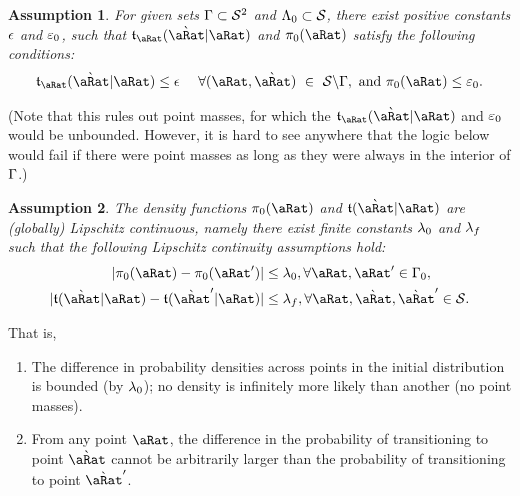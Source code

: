 \documentclass[\econtexRoot/BufferStockTheory.tex]{subfiles}
\begin{document}
\theoremstyle{plain}
\newtheorem{assumption}{Assumption}
\begin{assumption}\label{assn:Bounded} For given sets $\Gamma \subset \mathcal{S}^{2}$ and $\Lambda_{0} \subset \mathcal{S}$, there exist positive constants $\epsilon$ and $\varepsilon_{0}$, such that $\DnsPntNxtFmPntNow_{\pnt}(\Nxt{\pnt}|\pnt) $ and $\DnsPnt_{0}(\pnt)$ satisfy the following conditions:
  \begin{equation}\begin{gathered}\begin{aligned}
    \DnsPntNxtFmPntNow_{\pnt}(\Nxt{\pnt}|\pnt) \leq \DnsSetNxtFmPntNowBnd ~~~~\forall(\pnt,\Nxt{\pnt})~\in~\SetFullCnts \backslash \KrnPntNxtFmPntNowSetSprtTrnc, \text{~and~} \DnsPnt_{0}(\pnt) \leq \DnsPntBnd_{0}.
  \end{aligned}\end{gathered}\end{equation}
\end{assumption}

(Note that this rules out point masses, for which the $\DnsPntNxtFmPntNow_{\pnt}(\Nxt{\pnt}|\pnt)$ and $\varepsilon_{0}$ would be unbounded.  However, it is hard to see anywhere that the logic below would fail if there were point masses as long as they were always in the interior of $\Gamma$.)

\begin{assumption}\label{assn:Lipschitz} The density functions $\DnsPnt_{0}(\pnt)$ and $\DnsPntNxtFmPntNow(\Nxt{\pnt}|\pnt)$ are (globally) Lipschitz continuous, namely there exist finite constants $\lambda_{0}$ and $\lambda_{f}$ such that the following Lipschitz continuity assumptions hold:
  \begin{equation}\begin{gathered}\begin{aligned}
    |\DnsPnt_{0}(\pnt)-\DnsPnt_{0}(\pnt^{\prime})| & \leq \LipschitzDnsPntBnd, \forall \pnt,\pnt^{\prime}\in\KrnPntNxtFmPntNowSetSprtTrnc_{0}, \label{eq:LipCont}
    \\    |\DnsSetNxtFmPntNow(\Nxt{\pnt}|\pnt)-\DnsSetNxtFmPntNow(\Nxt{\pnt}^{\prime}|\pnt)| & \leq \LipschitzDnsPntNxtBnd, \forall \pnt,\Nxt{\pnt},\Nxt{\pnt}^{\prime}\in \SetFullCnts.    \notag
  \end{aligned}\end{gathered}\end{equation}
\end{assumption}
  That is,
  \begin{enumerate}
  \item The difference in probability densities across points in the initial distribution is bounded (by $\lambda_{0}$); no density is infinitely more likely than another (no point masses).
    \item From any point $\pnt$, the difference in the probability of transitioning to point $\Nxt{\pnt}$ cannot be arbitrarily larger than the probability of transitioning to point $\Nxt{\pnt}^{\prime}$.  
  \end{enumerate}
\end{document}
